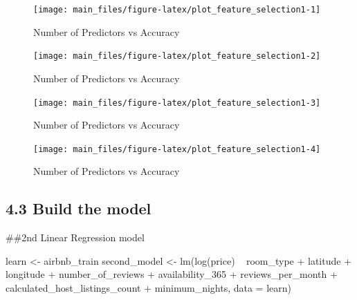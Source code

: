 \begin{Schunk}
\begin{figure}[H]

{\centering \texttt{[image: main\_files/figure-latex/plot\_feature\_selection1-1]} 

}

\caption[Number of Predictors vs Accuracy]{Number of Predictors vs Accuracy}\label{fig:plot_feature_selection11}
\end{figure}
\begin{figure}[H]

{\centering \texttt{[image: main\_files/figure-latex/plot\_feature\_selection1-2]} 

}

\caption[Number of Predictors vs Accuracy]{Number of Predictors vs Accuracy}\label{fig:plot_feature_selection12}
\end{figure}
\begin{figure}[H]

{\centering \texttt{[image: main\_files/figure-latex/plot\_feature\_selection1-3]} 

}

\caption[Number of Predictors vs Accuracy]{Number of Predictors vs Accuracy}\label{fig:plot_feature_selection13}
\end{figure}
\begin{figure}[H]

{\centering \texttt{[image: main\_files/figure-latex/plot\_feature\_selection1-4]} 

}

\caption[Number of Predictors vs Accuracy]{Number of Predictors vs Accuracy}\label{fig:plot_feature_selection14}
\end{figure}
\end{Schunk}

\hypertarget{build-the-model-1}{%
\subsection{4.3 Build the model}\label{build-the-model-1}}

\#\#2nd Linear Regression model

\begin{Schunk}
\begin{Sinput}
learn <- airbnb_train %
second_model <- lm(log(price) ~ room_type + latitude + longitude 
                        + number_of_reviews + availability_365
                       + reviews_per_month + 
                     calculated_host_listings_count + minimum_nights, data = learn)
\end{Sinput}
\end{Schunk}


